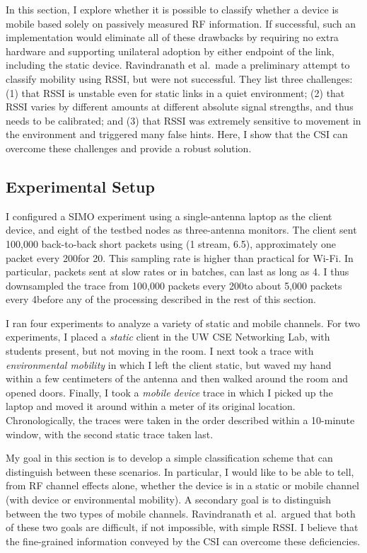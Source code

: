 In this section, I explore whether it is possible to classify whether a device is mobile based solely on passively measured RF information. If successful, such an implementation would eliminate all of these drawbacks by requiring no extra hardware and supporting unilateral adoption by either endpoint of the link, including the static device. Ravindranath et al.\ made a preliminary attempt to classify mobility using RSSI, but were not successful. They list three challenges: (1) that RSSI is unstable even for static links in a quiet environment; (2) that RSSI varies by different amounts at different absolute signal strengths, and thus needs to be calibrated; and (3) that RSSI was extremely sensitive to movement in the environment and triggered many false hints. Here, I show that the CSI can overcome these challenges and provide a robust solution.

\subsection{Experimental Setup}
I configured a SIMO experiment using a single-antenna laptop as the client device, and eight of the testbed nodes as three-antenna monitors. The client sent 100,000 back-to-back short packets using  (1 stream, 6.5\Mbps), approximately one packet every 200\us for 20\s. This sampling rate is higher than practical for Wi-Fi. In particular, packets sent at slow rates or in batches, can last as long as 4\ms. I thus downsampled the trace from 100,000 packets every 200\us to about 5,000 packets every 4\ms before any of the processing described in the rest of this section.

I ran four experiments to analyze a variety of static and mobile channels. For two experiments, I placed a \emph{static} client in the UW CSE Networking Lab, with students present, but not moving in the room. I next took a trace with \emph{environmental mobility} in which I left the client static, but waved my hand within a few centimeters of the antenna and then walked around the room and opened doors. Finally, I took a \emph{mobile device} trace in which I picked up the laptop and moved it around within a meter of its original location. Chronologically, the traces were taken in the order described within a 10-minute window, with the second static trace taken last.

My goal in this section is to develop a simple classification scheme that can distinguish between these scenarios. In particular, I would like to be able to tell, from RF channel effects alone, whether the device is in a static or mobile channel (with device or environmental mobility). A secondary goal is to distinguish between the two types of mobile channels. Ravindranath et al.\ argued that both of these two goals are difficult, if not impossible, with simple RSSI. I believe that the fine-grained information conveyed by the CSI can overcome these deficiencies.

